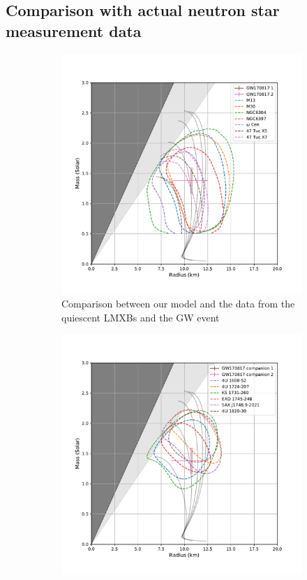 \documentclass[draft,11pt]{article}
\theoremstyle{definition}
\theoremstyle{remark}
\begin{document}
        \subsection{Comparison with actual neutron star measurement data}
            \begin{figure}[h]\begin{center}
                \begin{subfigure}[b]{.49\textwidth}
                    \includegraphics[width=\textwidth]{eos_compare_obsv1_GW}
                    \caption{Comparison between our model and the data from the quiescent LMXBs and the GW event}\label{fig/quiescent_LMXB}
                \end{subfigure}
                \begin{subfigure}[b]{.49\textwidth}
                    \includegraphics[width=\textwidth]{eos_compare_obsv2_GW}

\end{subfigure}
\end{center}
\end{figure}
\end{document}
